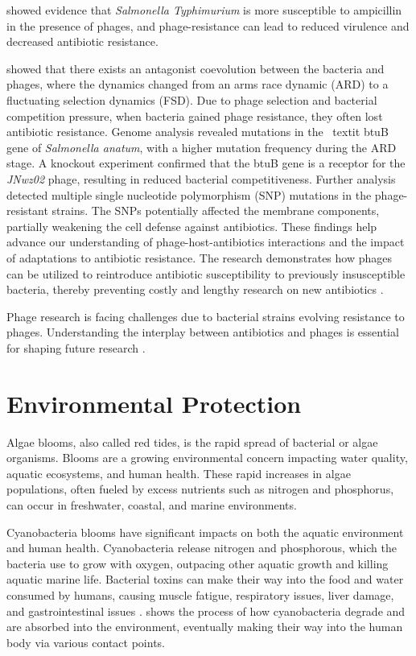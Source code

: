 \citet{laurePhageResistancemediatedTradeoffs2022} showed evidence that \textit{Salmonella Typhimurium} is more susceptible to ampicillin in the presence of phages, and phage-resistance can lead to reduced virulence and decreased antibiotic resistance. 

\citet{zhaoPhagedrivenCoevolutionReveals2024} showed that there exists an antagonist coevolution between the bacteria and phages, where the dynamics changed from an arms race dynamic (ARD) to a fluctuating selection dynamics (FSD).
Due to phage selection and bacterial competition pressure, when bacteria gained phage resistance, they often lost antibiotic resistance.
Genome analysis revealed mutations in the \ textit {btuB} gene of \textit{Salmonella anatum}, with a higher mutation frequency during the ARD stage.
A knockout experiment confirmed that the btuB gene is a receptor for the \textit{JNwz02} phage, resulting in reduced bacterial competitiveness.
Further analysis detected multiple single nucleotide polymorphism (SNP) mutations in the phage-resistant strains.
The SNPs potentially affected the membrane components, partially weakening the cell defense against antibiotics.
These findings help advance our understanding of phage-host-antibiotics interactions and the impact of adaptations to antibiotic resistance.
The research demonstrates how phages can be utilized to reintroduce antibiotic susceptibility to previously insusceptible bacteria, thereby preventing costly and lengthy research on new antibiotics \cite{zhaoPhagedrivenCoevolutionReveals2024}. 

Phage research is facing challenges due to bacterial strains evolving resistance to phages.
Understanding the interplay between antibiotics and phages is essential for shaping future research \cite{zhaoPhagedrivenCoevolutionReveals2024}.


\section{Environmental Protection}
\label{sec:AppendixB:environmental_protection}
Algae blooms, also called red tides, is the rapid spread of bacterial or algae organisms.
Blooms are a growing environmental concern impacting water quality, aquatic ecosystems, and human health.
These rapid increases in algae populations, often fueled by excess nutrients such as nitrogen and phosphorus, can occur in freshwater, coastal, and marine environments. 

Cyanobacteria blooms have significant impacts on both the aquatic environment and human health.
Cyanobacteria release nitrogen and phosphorous, which the bacteria use to grow with oxygen, outpacing other aquatic growth and killing aquatic marine life.
Bacterial toxins can make their way into the food and water consumed by humans, causing muscle fatigue, respiratory issues, liver damage, and gastrointestinal issues \cite{zhangImpactCyanobacteriaBlooms2022}.
 shows the process of how cyanobacteria degrade and are absorbed into the environment, eventually making their way into the human body via various contact points.
 
